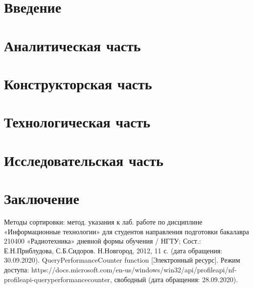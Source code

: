 \documentclass[10pt,a4paper]{report}
\begin{document}
	\renewcommand\bibname{Список литературы}
	
	
	
	\tableofcontents
	\newpage

	\chapter*{Введение}
	
	\newpage

	\chapter{Аналитическая часть}
	
	\newpage
	
	\chapter{Конструкторская часть}
	
	\newpage

	\chapter{Технологическая  часть}
			
	\newpage
	
	\chapter*{Исследовательская часть}
	\setcounter{chapter}{4}
	
	\newpage
	
	\chapter*{Заключение}
	
	\newpage
	
	\makeatletter %
	\def\@biblabel#1{#1. }
	\makeatother
	\begin{thebibliography}{2}
		 Методы сортировки: метод. указания к лаб. работе по дисциплине «Информационные технологии» для студентов направления подготовки бакалавра 210400 «Радиотехника» дневной формы обучения / НГТУ; Сост.: Е.Н.Приблудова, С.Б.Сидоров. Н.Новгород, 2012, 11 с. (дата обращения: 30.09.2020).
		 QueryPerformanceCounter function [Электронный ресурс]. Режим доступа: https://docs.microsoft.com/en-us/windows/win32/api/profileapi/nf-profileapi-queryperformancecounter, свободный (дата обращения: 28.09.2020).
	\end{thebibliography}
\end{document}
